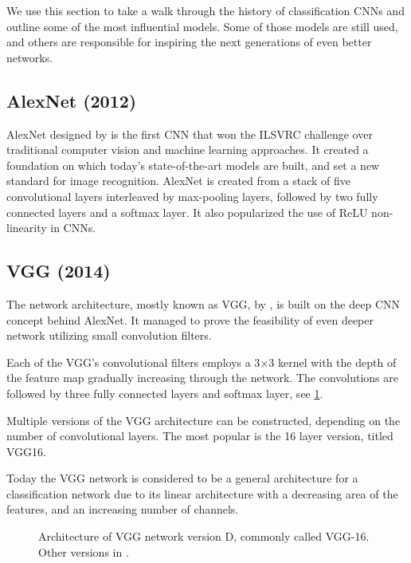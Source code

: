 We use this section to take a walk through the history of classification CNNs and outline some of the most influential models. Some of those models are still used, and others are responsible for inspiring the next generations of even better networks.

\subsection{AlexNet (2012)}
AlexNet designed by \citeauthor{bib:alexnet} \cite{bib:alexnet} is the first CNN that won the ILSVRC challenge over traditional computer vision and machine learning approaches. It created a foundation on which today's state-of-the-art models are built, and set a new standard for image recognition. AlexNet is created from a stack of five convolutional layers interleaved by max-pooling layers, followed by two fully connected layers and a softmax layer. It also popularized the use of ReLU non-linearity in CNNs.

\subsection{VGG (2014)}
\label{sec:VGG}
The network architecture, mostly known as VGG, by \citeauthor{bib:vgg} \cite{bib:vgg}, is built on the deep CNN concept behind AlexNet. It managed to prove the feasibility of even deeper network utilizing small convolution filters. 

Each of the VGG's convolutional filters employs a 3$\times$3 kernel with the depth of the feature map gradually increasing through the network. The convolutions are followed by three fully connected layers and softmax layer, see \cref{tab:vggarch}. 

Multiple versions of the VGG architecture can be constructed, depending on the number of convolutional layers. The most popular is the 16 layer version, titled VGG16.

Today the VGG network is considered to be a general architecture for a classification network due to its linear architecture with a decreasing area of the features, and an increasing number of channels. 

\begin{figure}
    \centering
    \caption[VGG-16 architecture]%
    {Architecture of VGG network version D, commonly called VGG-16. Other versions in \cite[table 1]{bib:vgg}.}
    \label{tab:vggarch}
\end{figure}

